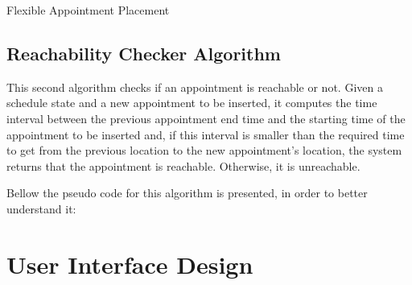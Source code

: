 \documentclass[12pt]{article}
\begin{document}
\begin{algorithm}[H]
\SetAlgoLined
{}
\caption{Flexible Appointment Placement}
\end{algorithm}

\subsection{Reachability Checker Algorithm}
This second algorithm checks if an appointment is reachable or not. Given a schedule state and a new appointment to be inserted, it computes the time interval between the previous appointment end time and the starting time of the appointment to be inserted and, if this interval is smaller than the required time to get from the previous location to the new appointment's location, the system returns that the appointment is reachable. Otherwise, it is unreachable.

Bellow the pseudo code for this algorithm is presented, in order to better understand it:

\begin{algorithm}[H]
\SetAlgoLined
{}
\end{algorithm}

\section{User Interface Design}
\end{document}

